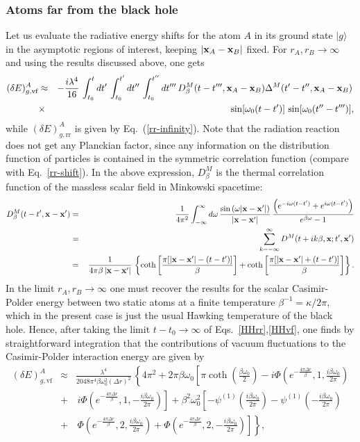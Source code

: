 \documentclass[twocolumn,prd,aps,showpacs,amsmath,amssymb]{revtex4-1}
\def\bea{\begin{eqnarray}}
\def\eea{\end{eqnarray}}
\def\nn{\nonumber}
\begin{document}
\begin{widetext}
\subsubsection{Atoms far from the black hole}
%
Let us evaluate the radiative energy shifts for the atom $A$ in its
ground state $|g\rangle$ in the asymptotic regions of interest,
keeping $|{\bf x}_{A} - {\bf x}_{B}|$ fixed. For $r_{A}, r_{B} \to
\infty$ and using the results discussed above, one gets
%
\bea\label{HHvf}
(\delta E)^{A}_{g,\textrm{vf}} &\approx& -\frac{i\lambda^4}{16}\,\int_{t_0}^{t}dt'\,\int_{t_0}^{t'}dt''\,\int_{t_0}^{t''}dt'''\,
D_{\beta}^{M}(t-t''',{\bf x}_{A}-{\bf x}_{B})\Delta^{M}(t'-t'',{\bf x}_{A}-{\bf x}_{B})\,
\nn\\
&\times&\,\sin[\omega_{0}(t - t')]\,\sin[\omega_{0}(t'' - t''')],
\eea
%
while $(\delta E)^{A}_{g,\textrm{rr}}$ is given by Eq.~(\ref{rr-infinity}). Note that the radiation reaction does not get any Planckian factor, since any information on the distribution function of particles is contained in the symmetric correlation function (compare with Eq.~\eqref{rr-shift}). In the above expression, $D_{\beta}^{M}$ is the thermal correlation function of the massless scalar field in Minkowski spacetime:
%
\bea
D_{\beta}^{M}(t-t',{\bf x}-{\bf x}') &=& \frac{1}{4\pi^2}\int_{-\infty}^{\infty} d\omega\,
\frac{\sin\left(\omega|{\bf x} - {\bf x}'|\right)}{|{\bf x} - {\bf x}'|}\,
\frac{\left(e^{-i\omega(t-t')} + e^{i\omega(t-t')}\right)}{e^{\beta\omega} - 1}
\nn\\
&=&\,\sum_{k = -\infty}^{\infty}D^{M}(t+ik\beta,{\bf x}; t', {\bf x}')
\nn\\
&=&\,\frac{1}{4\pi\beta\,|{\bf x} - {\bf x}'|}\,\left\{\coth\left[\frac{\pi[|{\bf x} - {\bf x}'| - (t-t')]}{\beta }\right] 
+ \coth\left[\frac{\pi[|{\bf x} - {\bf x}'| + (t-t')]}{\beta }\right]\right\}.
\eea
%
%
In the limit $r_{A}, r_{B} \to \infty$ one must recover the results
for the scalar Casimir-Polder energy between two static atoms at a
finite temperature $\beta^{-1} = \kappa/2\pi$, which in the present
case is just the usual Hawking temperature of the black hole. Hence, after taking the limit $t - t_0 \to \infty$ of
Eqs.~\eqref{HHrr},\eqref{HHvf},
 one finds by straightforward integration that the contributions
of vacuum fluctuations to the Casimir-Polder interaction energy are
given by 
%
\bea
(\delta E)^{A}_{g,\textrm{vf}} &\approx& \frac{\lambda^4}{2048\pi^4\beta\omega _0^2(\Delta r)^2}
\,\left\{4 \pi ^2 + 2 \pi  \beta  \omega _0 \left[\pi  \coth \left(\frac{\beta  \omega _0}{2}\right)
- i \Phi \left(e^{-\frac{4 \pi \Delta r}{\beta }},1,\frac{i \beta  \omega _0}{2 \pi }\right) \right. \right.
\nn\\
&+&\, \left. \left. i \Phi \left(e^{-\frac{4 \pi  \Delta r}{\beta }},1,-\frac{i \beta  \omega _0}{2 \pi }\right)\right] 
+ \beta ^2 \omega _0^2 \left[-\psi ^{(1)}\left(\frac{i \beta  \omega _0}{2 \pi }\right)
-\psi ^{(1)}\left(-\frac{i \beta  \omega _0}{2 \pi }\right) \right. \right.
\nn\\
&+&\,\left. \left. \Phi \left(e^{-\frac{4 \pi \Delta r}{\beta }},2,\frac{i \beta  \omega _0}{2 \pi }\right)
+\Phi \left(e^{-\frac{4 \pi  \Delta r}{\beta }},2,-\frac{i \beta  \omega _0}{2 \pi }\right)\right]\right\},
\eea
%
\end{widetext}
\end{document}
